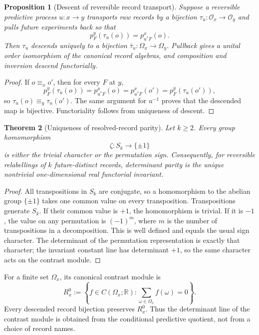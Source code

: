 \documentclass[11pt]{article}
\newtheorem{theorem}{Theorem}[section]
\newtheorem{proposition}[theorem]{Proposition}
\theoremstyle{definition}
\theoremstyle{remark}
\newcommand{\R}{\mathbb R}
\begin{document}
\begin{proposition}[Descent of reversible record transport]
\label{prop:record-transport-descent}
Suppose a reversible predictive process $u:x\to y$ transports raw records by
a bijection $\tau_u:\mathcal O_x\to\mathcal O_y$ and pulls future experiments
back so that
\[
 p_F^y(\tau_u(o))=p_{u^*F}^x(o).
\]
Then $\tau_u$ descends uniquely to a bijection
$\bar\tau_u:\Omega_x\to\Omega_y$.  Pullback gives a unital order isomorphism
of the canonical record algebras, and composition and inversion descend
functorially.
\end{proposition}

\begin{proof}
If $o\equiv_x o'$, then for every $F$ at $y$,
\[
 p_F^y(\tau_u(o))=p_{u^*F}^x(o)
 =p_{u^*F}^x(o')=p_F^y(\tau_u(o')),
\]
so $\tau_u(o)\equiv_y\tau_u(o')$.  The same argument for $u^{-1}$ proves that
the descended map is bijective.  Functoriality follows from uniqueness of
descent.
\end{proof}

\begin{theorem}[Uniqueness of resolved-record parity]
\label{thm:record-parity-unique}
Let $k\ge2$.  Every group homomorphism
\[
 \zeta:S_k\longrightarrow\{\pm1\}
\]
is either the trivial character or the permutation sign.  Consequently, for
reversible relabellings of $k$ future-distinct records, determinant parity is the
unique nontrivial one-dimensional real functorial invariant.
\end{theorem}

\begin{proof}
All transpositions in $S_k$ are conjugate, so a homomorphism to the abelian group
$\{\pm1\}$ takes one common value on every transposition.  Transpositions
generate $S_k$.  If their common value is $+1$, the homomorphism is trivial.  If
it is $-1$, the value on any permutation is $(-1)^m$, where $m$ is the number of
transpositions in a decomposition.  This is well defined and equals the usual
sign character.  The determinant of the permutation representation is exactly
that character; the invariant constant line has determinant $+1$, so the same
character acts on the contrast module.
\end{proof}

For a finite set $\Omega_x$, its canonical contrast module is
\[
 R_x^0:=\left\{f\in C(\Omega_x;\R):
             \sum_{\omega\in\Omega_x}f(\omega)=0\right\}.
\]
Every descended record bijection preserves $R_x^0$.  Thus the determinant line
of the contrast module is obtained from the conditional predictive quotient,
not from a choice of record names.
\end{document}
